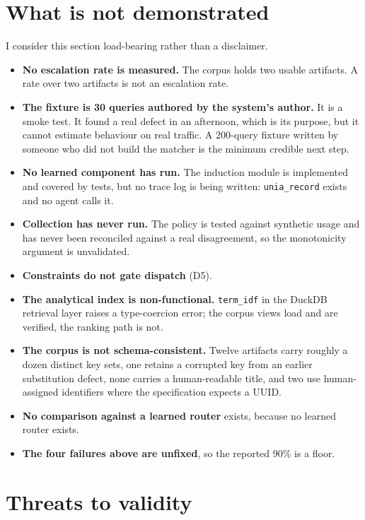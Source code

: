 \documentclass[11pt,twocolumn]{article}
\begin{document}
\section{What is not demonstrated}

I consider this section load-bearing rather than a disclaimer.

\begin{itemize}
\item \textbf{No escalation rate is measured.} The corpus holds two usable
      artifacts. A rate over two artifacts is not an escalation rate.
\item \textbf{The fixture is 30 queries authored by the system's author.} It is
      a smoke test. It found a real defect in an afternoon, which is its
      purpose, but it cannot estimate behaviour on real traffic. A 200-query
      fixture written by someone who did not build the matcher is the minimum
      credible next step.
\item \textbf{No learned component has run.} The induction module is
      implemented and covered by tests, but no trace log is being written:
      \texttt{unia\_record} exists and no agent calls it.
\item \textbf{Collection has never run.} The policy is tested against
      synthetic usage and has never been reconciled against a real
      disagreement, so the monotonicity argument is unvalidated.
\item \textbf{Constraints do not gate dispatch} (D5).
\item \textbf{The analytical index is non-functional.} \texttt{term\_idf} in
      the DuckDB retrieval layer raises a type-coercion error; the corpus views
      load and are verified, the ranking path is not.
\item \textbf{The corpus is not schema-consistent.} Twelve artifacts carry
      roughly a dozen distinct key sets, one retains a corrupted key from an
      earlier substitution defect, none carries a human-readable title, and two
      use human-assigned identifiers where the specification expects a UUID.
\item \textbf{No comparison against a learned router} exists, because no
      learned router exists.
\item \textbf{The four failures above are unfixed}, so the reported 90\% is a
      floor.
\end{itemize}

\section{Threats to validity}
\end{document}
